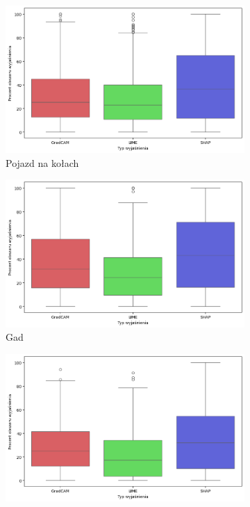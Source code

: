 \begin{figure}[h]
	\begin{subfigure}[b]{0.3\textwidth}
		\centering\includegraphics[width=.9\textwidth]{img/areaincorrect_vehicle}
		\caption{Pojazd na kołach}
	\end{subfigure}
	\begin{subfigure}[b]{0.3\textwidth}
		\centering\includegraphics[width=.9\textwidth]{img/areaincorrect_reptile}
		\caption{Gad}
	\end{subfigure}
	\begin{subfigure}[b]{0.3\textwidth}
		\centering\includegraphics[width=.9\textwidth]{img/areaincorrect_carnivore}

\end{subfigure}
\end{figure}
